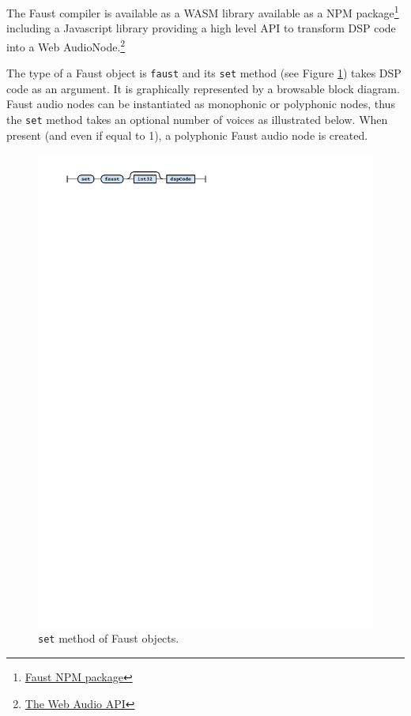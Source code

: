 \documentclass{article}
\newcommand{\icode}[1]	{{\small \texttt{#1}}}
\begin{document}
The Faust compiler is available as a WASM library \cite{letz:hal-02158925} available as a NPM package\footnote{\href{https://www.npmjs.com/package/@grame/libfaust}{Faust NPM package}} including a Javascript library providing a high level API to transform DSP code into a Web AudioNode.\footnote{\href{https://developer.mozilla.org/en-US/docs/Web/API/Web_Audio_API}{The Web Audio API}}

The type of a Faust object is \icode{faust} and its \icode{set} method (see Figure \ref{fig:fset}) takes DSP code as an argument. It is graphically represented by a browsable block diagram. Faust audio nodes can be instantiated as monophonic or polyphonic nodes, thus the \icode{set} method takes an optional number of voices as illustrated below. When present (and even if equal to 1), a polyphonic Faust audio node is created. 
\begin{figure}[h]
\centering
\includegraphics[width=0.9\columnwidth]{rsrc/faust1.pdf}
\caption{\icode{set} method of Faust objects.}
\label{fig:fset}
\end{figure}
\end{document}
